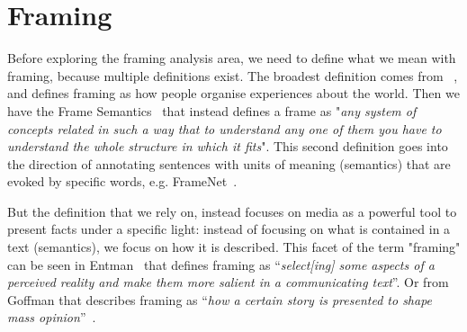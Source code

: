 
\section{Framing}
\label{sec:lit_framing}

Before exploring the framing analysis area, we need to define what we mean with framing, because multiple definitions exist.
The broadest definition comes from ~\cite{goffman1974frame}, and defines framing as how people organise experiences about the world.
Then we have the Frame Semantics~\cite{fillmore2006frame} that instead defines a frame as "\textit{any system of concepts related in such a way that to understand any one of them you have to understand the whole structure in which it fits}". This second definition goes into the direction of annotating sentences with units of meaning (semantics) that are evoked by specific words, e.g. FrameNet~\cite{baker1998berkeley}.

But the definition that we rely on, instead focuses on media as a powerful tool to present facts under a specific light: instead of focusing on what is contained in a text (semantics), we focus on how it is described. This facet of the term "framing" can be seen in
Entman~\cite{entman1993framing} that defines framing as ``\textit{select[ing] some aspects of a perceived reality and make them more salient in a communicating text}''.
Or from Goffman that describes framing as ``\textit{how a certain story is presented to shape mass opinion}''~\cite{goffman1974frame}.


